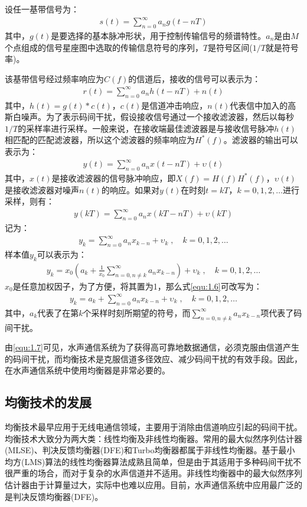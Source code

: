 设任一基带信号为：
\begin{eqnarray}
    s(t)=\sum_{n=0}^{\infty}a_ng(t-nT)
    \label{equ:1.1}
\end{eqnarray}
其中，$g(t)$是要选择的基本脉冲形状，用于控制传输信号的频谱特性。$a_n$是由$M$个点组成的信号星座图中选取的传输信息符号的序列，$T$是符号区间($1/T$就是符号率)。

该基带信号经过频率响应为$C(f)$的信道后，接收的信号可以表示为：
\begin{eqnarray}
    r(t)=\sum_{n=0}^{\infty}a_nh(t-nT)+n(t)
    \label{equ:1.2}
\end{eqnarray}
其中，$h(t)=g(t)*c(t)$，$c(t)$是信道冲击响应，$n(t)$代表信中加入的高斯白噪声。为了表示码间干扰，假设接收信号通过一个接收滤波器，然后以每秒$1/T$的采样率进行采样。一般来说，在接收端最佳滤波器是与接收信号脉冲$h(t)$相匹配的匹配滤波器，所以这个滤波器的频率响应为$H^*(f)$。滤波器的输出可以表示为：
\begin{eqnarray}
    y(t)=\sum_{n=0}^{\infty}a_nx(t-nT)+\upsilon(t)
    \label{equ:1.3}
\end{eqnarray}
其中，$x(t)$是接收滤波器的信号脉冲响应，即$X(f)=H(f)H^*(f)$，$\upsilon(t)$是接收滤波器对噪声$n(t)$的响应。如果对$y(t)$在时刻$t=kT$，$k=0,1,2,\ldots$进行采样，则有：
\begin{eqnarray}
    y(kT)=\sum_{n=0}^{\infty}a_nx(kT-nT)+\upsilon(kT)
    \label{equ:1.4}
\end{eqnarray}
记为：
\begin{eqnarray}
    y_k=\sum_{n=0}^{\infty}a_nx_{k-n}+\upsilon_k\;,\quad k=0,1,2,\ldots
    \label{equ:1.5}
\end{eqnarray}
样本值$y_k$可以表示为：
\begin{eqnarray}
    y_k=x_0\left(a_k+\frac{1}{x_0}\sum_{n=0, n\neq k}^{\infty}a_nx_{k-n}\right)+\upsilon_k\;,\quad k=0,1,2,\ldots
    \label{equ:1.6}
\end{eqnarray}
$x_0$是任意加权因子，为了方便，将其置为1，那么式\ref{equ:1.6}可改写为：
\begin{eqnarray}
    y_k=a_k+\sum_{n=0}^{\infty}a_nx_{k-n}+\upsilon_k\;,\quad k=0,1,2,\ldots
    \label{equ:1.7}
\end{eqnarray}
其中，$a_k$代表了在第$k$个采样时刻所期望的符号，而$\sum_{n=0, n\neq k}^{\infty}a_nx_{k-n}$项代表了码间干扰。

由\ref{equ:1.7}可见，水声通信系统为了获得高可靠地数据通信，必须克服由信道产生的码间干扰，而均衡技术是克服信道多径效应、减少码间干扰的有效手段。因此，在水声通信系统中使用均衡器是非常必要的。
\subsection{均衡技术的发展}
均衡技术最早应用于无线电通信领域，主要用于消除由信道响应引起的码间干扰。均衡技术大致分为两大类：线性均衡及非线性均衡器。常用的最大似然序列估计器(MLSE)、判决反馈均衡器(DFE)和Turbo均衡器都属于非线性均衡器。基于最小均方(LMS)算法的线性均衡器算法成熟且简单，但是由于其适用于多种码间干扰不很严重的场合，而对于复杂的水声信道并不适用。非线性均衡器中的最大似然序列估计器由于计算量过大，实际中也难以应用。目前，水声通信系统中应用最广泛的是判决反馈均衡器(DFE)。

